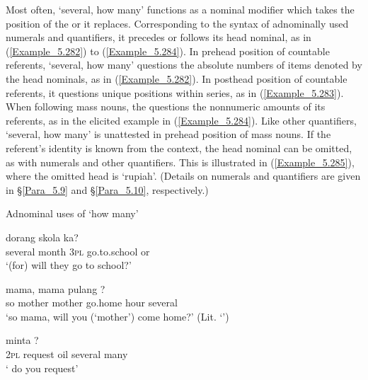 Most often,  ‘several, how many’ functions as a nominal modifier which takes the position of the  or  it replaces. Corresponding to the syntax of adnominally used numerals and quantifiers, it precedes or follows its head nominal, as in (\ref{Example_5.282}) to (\ref{Example_5.284}). In prehead position of countable referents,  ‘several, how many’ questions the absolute numbers of items denoted by the head nominals, as in (\ref{Example_5.282}). In posthead position of countable referents, it questions unique positions within series, as in (\ref{Example_5.283}). When following mass nouns, the  questions the nonnumeric amounts of its referents, as in the elicited example in (\ref{Example_5.284}). Like other quantifiers,  ‘several, how many’ is unattested in prehead position of mass nouns. If the referent’s identity is known from the context, the head nominal can be omitted, as with numerals and other quantifiers. This is illustrated in (\ref{Example_5.285}), where the omitted head is  ‘rupiah’. (Details on numerals and quantifiers are given in §\ref{Para_5.9} and §\ref{Para_5.10}, respectively.)


\begin{styleExampleTitle}
Adnominal uses of  ‘how many’
\end{styleExampleTitle}

\ea
\label{Example_5.282}
 {} {dorang} {skola} {ka?}\\ %
 several  month  \textsc{3pl}  go.to.school  or\\
\glt 
‘(for)  will they go to school?’ \textstyleExampleSource{[081025-003-Cv.0207]}
\z

\ea
\label{Example_5.283}
 {mama,} {mama} {pulang} {} {?}\\ %
 so  mother  mother  go.home  hour  several\\
\glt 
‘so mama,  will you (‘mother’) come home?’ (Lit. ‘’) \textstyleExampleSource{[080924-002-Pr.0002]}
\z

\ea
\label{Example_5.284}
 {minta} {} {} {?}\\ %
 \textsc{2pl}  request  oil  several  many\\
\glt 
‘ do you request’ \textstyleExampleSource{[Elicited BR120520.001]}
\z


